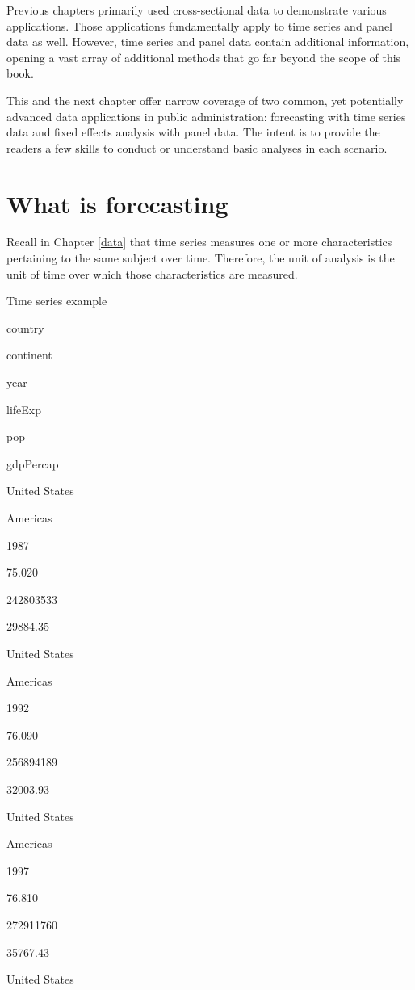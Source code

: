 \documentclass[
]{book}
\begin{document}
Previous chapters primarily used cross-sectional data to demonstrate various applications. Those applications fundamentally apply to time series and panel data as well. However, time series and panel data contain additional information, opening a vast array of additional methods that go far beyond the scope of this book.

This and the next chapter offer narrow coverage of two common, yet potentially advanced data applications in public administration: forecasting with time series data and fixed effects analysis with panel data. The intent is to provide the readers a few skills to conduct or understand basic analyses in each scenario.

\hypertarget{what-is-forecasting}{%
\section{What is forecasting}\label{what-is-forecasting}}

Recall in Chapter \ref{data} that time series measures one or more characteristics pertaining to the same subject over time. Therefore, the unit of analysis is the unit of time over which those characteristics are measured.

\label{tab:timeseriesrep}Time series example

country

continent

year

lifeExp

pop

gdpPercap

United States

Americas

1987

75.020

242803533

29884.35

United States

Americas

1992

76.090

256894189

32003.93

United States

Americas

1997

76.810

272911760

35767.43

United States
\end{document}
